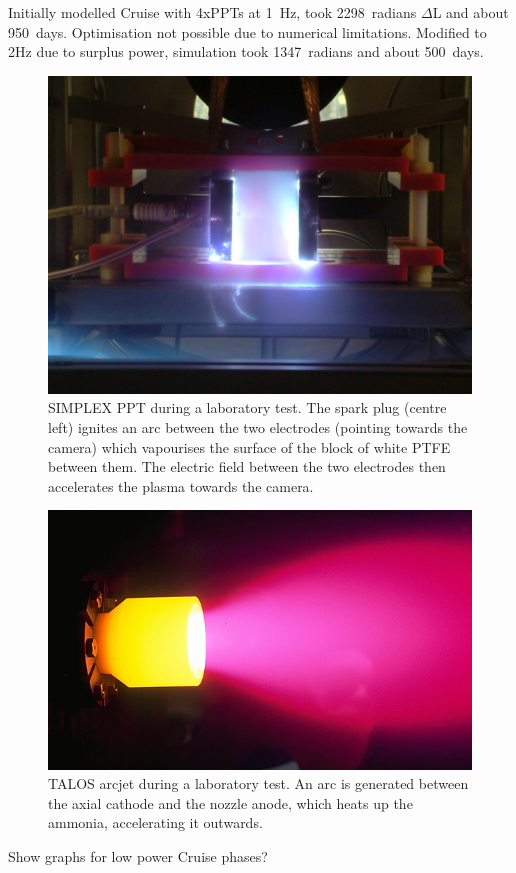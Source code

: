 Initially modelled Cruise with 4xPPTs at 1~Hz, took 2298~radians $\Delta$L and about 950~days. Optimisation not possible due to numerical limitations. Modified to 2Hz due to surplus power, simulation took 1347~radians and about 500~days.
\begin{figure}
\includegraphics[width=\textwidth]{Images/PPT_test.JPG}
\caption{SIMPLEX PPT during a laboratory test. The spark plug (centre left) ignites an arc between the two electrodes (pointing towards the camera) which vapourises the surface of the block of white PTFE between them. The electric field between the two electrodes then accelerates the plasma towards the camera.}\label{fig:PPT}
\end{figure}
\begin{figure}
\includegraphics[width=\textwidth]{Images/hiparc_betrieb.png}
\caption{TALOS arcjet during a laboratory test. An arc is generated between the axial cathode and the nozzle anode, which heats up the ammonia, accelerating it outwards.}\label{fig:arcjet}
\end{figure}
Show graphs for low power Cruise phases? 

